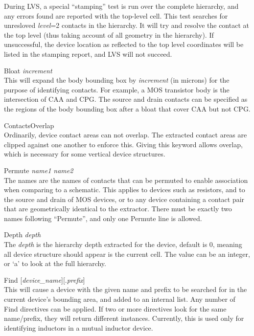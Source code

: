 \begin{description}
\begin{description}
During LVS, a special ``stamping'' test is run over the complete
hierarchy, and any errors found are reported with the top-level cell. 
This test searches for unresloved {\it level\/}=2 contacts in the
hierarchy.  It will try and resolve the contact at the top level (thus
taking account of all geometry in the hierarchy).  If unsuccessful,
the device location as reflected to the top level coordinates will be
listed in the stamping report, and LVS will not succeed.
\end{description}

\item{\et Bloat} {\it increment}\\
This will expand the body bounding box by {\it increment} (in microns)
for the purpose of identifying contacts.  For example, a MOS
transistor body is the intersection of CAA and CPG.  The source and
drain contacts can be specified as the regions of the body bounding
box after a bloat that cover CAA but not CPG.

\item{\et ContactsOverlap}\\
Ordinarily, device contact areas can not overlap.  The extracted
contact areas are clipped against one another to enforce this.  Giving
this keyword allows overlap, which is necessary for some vertical
device structures.

\item{\et Permute} {\it name1 name2}\\
The names are the names of contacts that can be permuted to enable
association when comparing to a schematic.  This applies to devices
such as resistors, and to the source and drain of MOS devices, or to
any device containing a contact pair that are geometrically identical
to the extractor.  There must be exactly two names following
``Permute'', and only one {\et Permute} line is allowed.

\item{\et Depth} {\it depth}\\
The {\it depth} is the hierarchy depth extracted for the device,
default is 0, meaning all device structure should appear is the
current cell.  The value can be an integer, or `a' to look at the full
hierarchy.

\item{\et Find} [{\it device\_name}][.{\it prefix}]\\
This will cause a device with the given name and prefix to be searched
for in the current device's bounding area, and added to an internal
list.  Any number of {\et Find} directives can be applied.  If two or
more directives look for the same name/prefix, they will return
different instances.  Currently, this is used only for identifying
inductors in a mutual inductor device.


\end{description}
